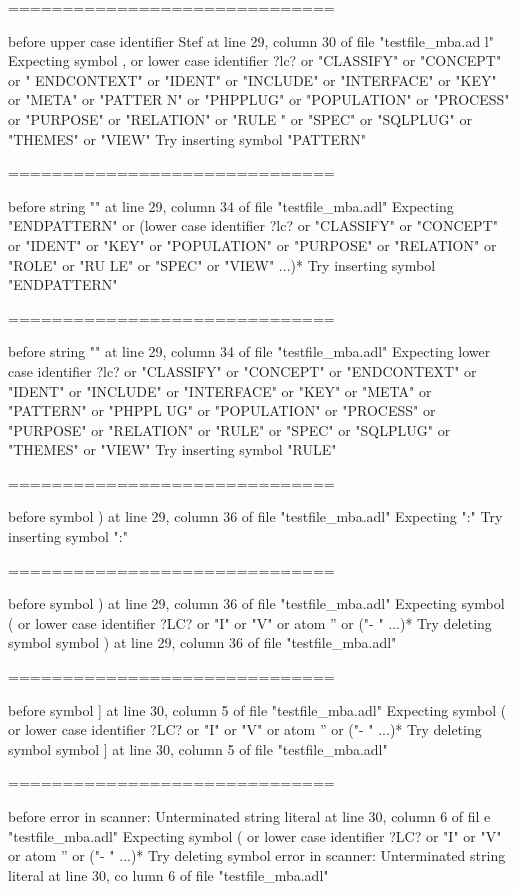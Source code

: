 \begin{description}
\begin{haskell}
==============================

before upper case identifier Stef at line 29, column 30 of file "testfile_mba.ad
l"
Expecting symbol , or lower case identifier ?lc? or "CLASSIFY" or "CONCEPT" or "
ENDCONTEXT" or "IDENT" or "INCLUDE" or "INTERFACE" or "KEY" or "META" or "PATTER
N" or "PHPPLUG" or "POPULATION" or "PROCESS" or "PURPOSE" or "RELATION" or "RULE
" or "SPEC" or "SQLPLUG" or "THEMES" or "VIEW"
Try inserting symbol "PATTERN"

==============================

before string "" at line 29, column 34 of file "testfile_mba.adl"
Expecting "ENDPATTERN" or (lower case identifier ?lc? or "CLASSIFY" or "CONCEPT"
 or "IDENT" or "KEY" or "POPULATION" or "PURPOSE" or "RELATION" or "ROLE" or "RU
LE" or "SPEC" or "VIEW" ...)*
Try inserting symbol "ENDPATTERN"

==============================

before string "" at line 29, column 34 of file "testfile_mba.adl"
Expecting lower case identifier ?lc? or "CLASSIFY" or "CONCEPT" or "ENDCONTEXT"
or "IDENT" or "INCLUDE" or "INTERFACE" or "KEY" or "META" or "PATTERN" or "PHPPL
UG" or "POPULATION" or "PROCESS" or "PURPOSE" or "RELATION" or "RULE" or "SPEC"
or "SQLPLUG" or "THEMES" or "VIEW"
Try inserting symbol "RULE"

==============================

before symbol ) at line 29, column 36 of file "testfile_mba.adl"
Expecting ":"
Try inserting symbol ":"

==============================

before symbol ) at line 29, column 36 of file "testfile_mba.adl"
Expecting symbol ( or lower case identifier ?LC? or "I" or "V" or atom '' or ("-
" ...)*
Try deleting symbol symbol ) at line 29, column 36 of file "testfile_mba.adl"

==============================

before symbol ] at line 30, column 5 of file "testfile_mba.adl"
Expecting symbol ( or lower case identifier ?LC? or "I" or "V" or atom '' or ("-
" ...)*
Try deleting symbol symbol ] at line 30, column 5 of file "testfile_mba.adl"

==============================

before error in scanner: Unterminated string literal at line 30, column 6 of fil
e "testfile_mba.adl"
Expecting symbol ( or lower case identifier ?LC? or "I" or "V" or atom '' or ("-
" ...)*
Try deleting symbol error in scanner: Unterminated string literal at line 30, co
lumn 6 of file "testfile_mba.adl"


\end{haskell}
\end{description}
